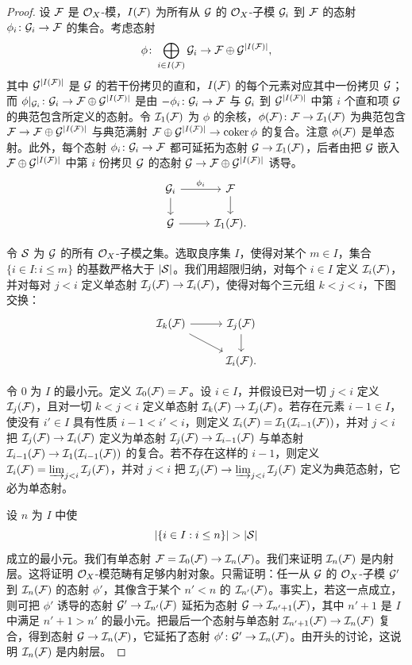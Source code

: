 \begin{proof}
设 $\cF$ 是 $\cO_X$-模，$I(\cF)$ 为所有从 $\cG$ 的 $\cO_X$-子模 $\cG_i$ 到 $\cF$ 的态射 $\phi_i\colon\cG_i\to\cF$ 的集合。考虑态射
\[
\phi\colon\bigoplus_{i\in I(\cF)}\cG_i\to\cF\oplus\cG^{|I(\cF)|},
\]
其中 $\cG^{|I(\cF)|}$ 是 $\cG$ 的若干份拷贝的直和，$I(\cF)$ 的每个元素对应其中一份拷贝 $\cG$；而 $\phi|_{\cG_i}\colon\cG_i\to\cF\oplus\cG^{|I(\cF)|}$ 是由 $-\phi_i\colon\cG_i\to\cF$ 与 $\cG_i$ 到 $\cG^{|I(\cF)|}$ 中第 $i$ 个直和项 $\cG$ 的典范包含所定义的态射。令 $\cI_1(\cF)$ 为 $\phi$ 的余核，$\phi(\cF)\colon\cF\to\cI_1(\cF)$ 为典范包含 $\cF\to\cF\oplus\cG^{|I(\cF)|}$ 与典范满射 $\cF\oplus\cG^{|I(\cF)|}\to\coker\phi$ 的复合。注意 $\phi(\cF)$ 是单态射。此外，每个态射 $\phi_i\colon\cG_i\to\cF$ 都可延拓为态射 $\cG\to\cI_1(\cF)$，后者由把 $\cG$ 嵌入 $\cF\oplus\cG^{|I(\cF)|}$ 中第 $i$ 份拷贝 $\cG$ 的态射 $\cG\to\cF\oplus\cG^{|I(\cF)|}$ 诱导。
\[\begin{tikzcd}[column sep=2.6em,row sep=1.5em]
\cG_i \arrow[r,"\phi_i"] \arrow[d] & \cF \arrow[d] \\
\cG \arrow[r] & \cI_1(\cF).
\end{tikzcd}\]

令 $\cS$ 为 $\cG$ 的所有 $\cO_X$-子模之集。选取良序集 $I$，使得对某个 $m\in I$，集合 $\{i\in I : i\le m\}$ 的基数严格大于 $|\cS|$。我们用超限归纳，对每个 $i\in I$ 定义 $\cI_i(\cF)$，并对每对 $j<i$ 定义单态射 $\cI_j(\cF)\to\cI_i(\cF)$，使得对每个三元组 $k<j<i$，下图交换：
\[\begin{tikzcd}[column sep=2.8em,row sep=1.6em]
\cI_k(\cF) \arrow[r] \arrow[dr] & \cI_j(\cF) \arrow[d] \\
& \cI_i(\cF).
\end{tikzcd}\]

令 $0$ 为 $I$ 的最小元。定义 $\cI_0(\cF)=\cF$。设 $i\in I$，并假设已对一切 $j<i$ 定义 $\cI_j(\cF)$，且对一切 $k<j<i$ 定义单态射 $\cI_k(\cF)\to\cI_j(\cF)$。若存在元素 $i-1\in I$，使没有 $i'\in I$ 具有性质 $i-1<i'<i$，则定义 $\cI_i(\cF)=\cI_1(\cI_{i-1}(\cF))$，并对 $j<i$ 把 $\cI_j(\cF)\to\cI_i(\cF)$ 定义为单态射 $\cI_j(\cF)\to\cI_{i-1}(\cF)$ 与单态射 $\cI_{i-1}(\cF)\to\cI_1(\cI_{i-1}(\cF))$ 的复合。若不存在这样的 $i-1$，则定义 $\cI_i(\cF)=\dlim_{j<i}\cI_j(\cF)$，并对 $j<i$ 把 $\cI_j(\cF)\to\dlim_{j<i}\cI_j(\cF)$ 定义为典范态射，它必为单态射。

设 $n$ 为 $I$ 中使
\[
|\{i\in I : i\le n\}|>|\cS|
\]
成立的最小元。我们有单态射 $\cF=\cI_0(\cF)\to\cI_n(\cF)$。我们来证明 $\cI_n(\cF)$ 是内射层。这将证明 $\cO_X$-模范畴有足够内射对象。只需证明：任一从 $\cG$ 的 $\cO_X$-子模 $\cG'$ 到 $\cI_n(\cF)$ 的态射 $\phi'$，其像含于某个 $n'<n$ 的 $\cI_{n'}(\cF)$。事实上，若这一点成立，则可把 $\phi'$ 诱导的态射 $\cG'\to\cI_{n'}(\cF)$ 延拓为态射 $\cG\to\cI_{n'+1}(\cF)$，其中 $n'+1$ 是 $I$ 中满足 $n'+1>n'$ 的最小元。把最后一个态射与单态射 $\cI_{n'+1}(\cF)\to\cI_n(\cF)$ 复合，得到态射 $\cG\to\cI_n(\cF)$，它延拓了态射 $\phi'\colon\cG'\to\cI_n(\cF)$。由开头的讨论，这说明 $\cI_n(\cF)$ 是内射层。


\end{proof}

